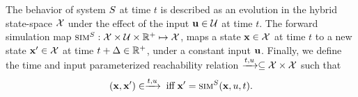 % 





\begin{definition}
    The behavior of system $S$ at time $t$ is described as an
    evolution in the hybrid state-space $\mathcal{X}$ under the
    effect of the input $\mathbf{u} \in \mathcal{U}$ at time $t$. The forward
    simulation map $\mbox{\sc sim}^{S} : \mathcal{X} \times \mathcal{U}
    \times \mathbb{R}^+ \mapsto \mathcal{X}$, maps a state $\mathbf{x}\in\mathcal{X}$ at time
    $t$ to a new state $\mathbf{x}'\in\mathcal{X}$ at time $t+\Delta\in\mathbb{R}^+$, under a constant
    input $\mathbf{u}$.  Finally, we define the time and input parameterized
    reachability relation $\xrightarrow{t,u} \subseteq \mathcal{X} \times
    \mathcal{X}$ such that
    \begin{equation}
        (\mathbf{x},\mathbf{x}') \in \xrightarrow{t,u} \;\text{iff}\; \mathbf{x}'=\mbox{\sc sim}^{S}(\mathbf{x},u,t).
    \end{equation}
\end{definition}


